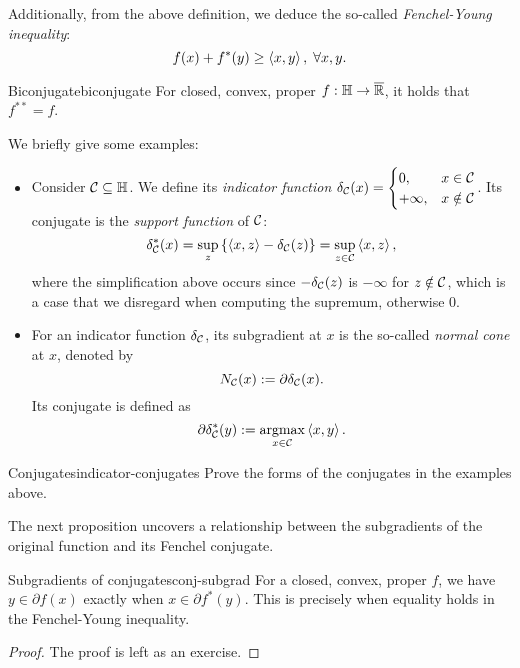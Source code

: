 Additionally, from the above definition, we deduce the so-called
\textit{Fenchel-Young inequality}:
\[
    f(x) + f^*(y) \geq \left\langle x, y \right\rangle, \; \forall x, y.
\]

\begin{ctheorem}{Biconjugate}{biconjugate}
    For closed, convex, proper $f: \mathbb{H} \to \overline{\mathbb{R}}$, it holds that
    $f^{**} = f$.
\end{ctheorem}

We briefly give some examples:
\begin{itemize}
\item Consider $\mathcal{C} \subseteq \mathbb{H}$. We define its \textit{indicator function}
    $\delta_{\mathcal{C}}(x) = \begin{cases}
        0, & x \in \mathcal{C} \\
        +\infty, & x \notin \mathcal{C}
    \end{cases}$. Its conjugate is the \textit{support function} of $\mathcal{C}$:
    \[
        \delta_{\mathcal{C}}^*(x) = \sup_{z} \left\{ \left\langle x, z \right\rangle - \delta_{\mathcal{C}}(z) \right\}
        = \sup_{z \in \mathcal{C}} \left\langle x, z \right\rangle,
    \]
    where the simplification above occurs since $-\delta_{\mathcal{C}}(z)$ is $-\infty$
    for $z \notin \mathcal{C}$, which is a case that we disregard when computing the
    supremum, otherwise $0$.
\item For an indicator function $\delta_{\mathcal{C}}$, its subgradient at $x$ is the
    so-called \textit{normal cone} at $x$, denoted by
    \[
        N_{\mathcal{C}}(x) := \partial \delta_{\mathcal{C}}(x).
    \]
    Its conjugate is defined as
    \[
        \partial \delta_{\mathcal{C}}^*(y) := \operatorname*{argmax}_{x \in \mathcal{C}} \left\langle x, y \right\rangle.
    \]
\end{itemize}

\begin{exercise}{Conjugates}{indicator-conjugates}
    Prove the forms of the conjugates in the examples above.
\end{exercise}

The next proposition uncovers a relationship between the subgradients of the
original function and its Fenchel conjugate.
\begin{cproposition}{Subgradients of conjugates}{conj-subgrad}
    For a closed, convex, proper $f$, we have $y \in \partial f(x)$ exactly when
    $x \in \partial f^*(y)$. This is precisely when equality holds in the
    Fenchel-Young inequality.
\end{cproposition}
\begin{proof}
    The proof is left as an exercise.
\end{proof}

